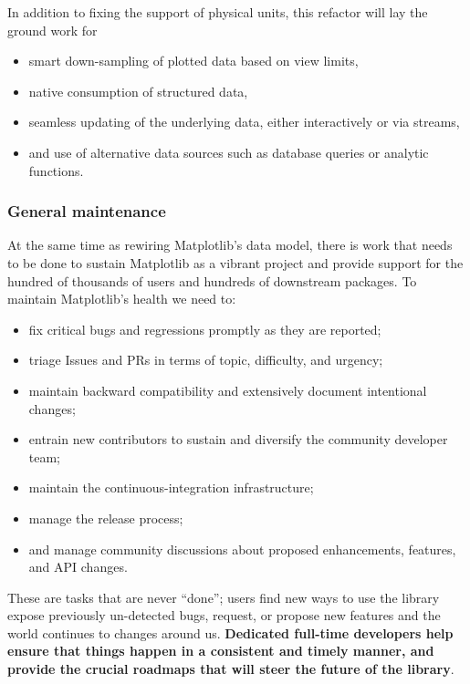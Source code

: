 \documentclass[12pt]{article}
\numberwithin{page}{section}
\begin{document}
In addition to fixing
the support of physical units, this refactor will lay the ground work for
\begin{itemize}[noitemsep]
  \item smart down-sampling of plotted data based on view limits,
  \item native consumption of structured data,
  \item seamless updating of the underlying data, either interactively
    or via streams,
  \item and use of alternative data sources such as database queries
    or analytic functions.
\end{itemize}

\subsubsection{General maintenance}

At the same time as rewiring Matplotlib's data model, there is work
that needs to be done to sustain Matplotlib as a vibrant project and
provide support for the hundred of thousands of users and hundreds of
downstream packages.  To maintain Matplotlib's health we need to:
\begin{itemize}[noitemsep]
\item fix critical bugs and regressions promptly as they are reported;
\item triage Issues and PRs in terms of topic, difficulty, and
  urgency;
\item maintain backward compatibility and extensively document
  intentional changes;
\item entrain new contributors to sustain and diversify the community
  developer team;
\item maintain the continuous-integration infrastructure;
\item manage the release process;
\item and manage community discussions about proposed enhancements, features,
  and API changes.
\end{itemize}
These are tasks that are never ``done''; users find new ways to use
the library expose previously un-detected bugs, request, or propose new
features and the world continues to changes around us.   \textbf{Dedicated
full-time developers help ensure that things happen in a consistent and timely manner, and provide the crucial roadmaps that will steer the future of the library}.


\end{document}
